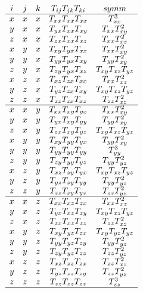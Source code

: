 \[
\begin{array}{ccccc}
i & j & k & T_{ij}T_{jk}T_{ki} & symm \\
\hline
x&x&x&  T_{xx}T_{xx}T_{xx}  & T_{xx}^3  \\
y&x&x&  T_{yx}T_{xx}T_{xy}  & T_{xx}T_{xy}^2 \\
z&x&x&  T_{zx}T_{xx}T_{xz}  & T_{xx}T_{xz}^2 \\
x&y&x&  T_{xy}T_{yx}T_{xx}  & T_{xx}T_{xy}^2 \\
y&y&x&  T_{yy}T_{yx}T_{xy}  & T_{yy}T_{xy}^2 \\
z&y&x&  T_{zy}T_{yx}T_{xz}  & T_{xy}T_{xz}T_{yz} \\
x&z&x&  T_{xz}T_{zx}T_{xx}  & T_{xx}T_{xz}^2 \\
y&z&x&  T_{yz}T_{zx}T_{xy}  & T_{xy}T_{xz}T_{yz} \\
z&z&x&  T_{zz}T_{zx}T_{xz}  & T_{zz}T_{xz}^2 \\
\hline
x&x&y&  T_{xx}T_{xy}T_{yx}  & T_{xx}T_{xy}^2 \\
y&x&y&  T_{yx}T_{xy}T_{yy}  & T_{yy}T_{xy}^2 \\
z&x&y&  T_{zx}T_{xy}T_{yz}  & T_{xy}T_{xz}T_{yz} \\
x&y&y&  T_{xy}T_{yy}T_{yx}  & T_{yy}T_{xy}^2 \\
y&y&y&  T_{yy}T_{yy}T_{yy}  & T_{yy}^3  \\
z&y&y&  T_{zy}T_{yy}T_{yz}  & T_{yy}T_{yz}^2 \\
x&z&y&  T_{xz}T_{zy}T_{yx}  & T_{xy}T_{xz}T_{yz} \\
y&z&y&  T_{yz}T_{zy}T_{yy}  & T_{yy}T_{yz}^2 \\
z&z&y&  T_{zz}T_{zy}T_{yz}  & T_{zz}T_{yz}^2 \\
\hline
x&x&z&  T_{xx}T_{xz}T_{zx}  & T_{xx}T_{xz}^2 \\
y&x&z&  T_{yx}T_{xz}T_{zy}  & T_{xy}T_{xz}T_{yz}\\
z&x&z&  T_{zx}T_{xz}T_{zz}  & T_{zz}T_{xz}^2\\
x&y&z&  T_{xy}T_{yz}T_{zx}  & T_{xy}T_{yz}T_{yz}\\
y&y&z&  T_{yy}T_{yz}T_{zy}  & T_{yy}T_{yz}^2\\
z&y&z&  T_{zy}T_{yz}T_{zz}  & T_{zz}T_{yz}^2\\
x&z&z&  T_{xz}T_{zz}T_{zx}  & T_{zz}T_{xz}^2\\
y&z&z&  T_{yz}T_{zz}T_{zy}  & T_{zz}T_{yz}^2\\
z&z&z&  T_{zz}T_{zz}T_{zz}  & T_{zz}^3  \\
\hline
\end{array}
\]
